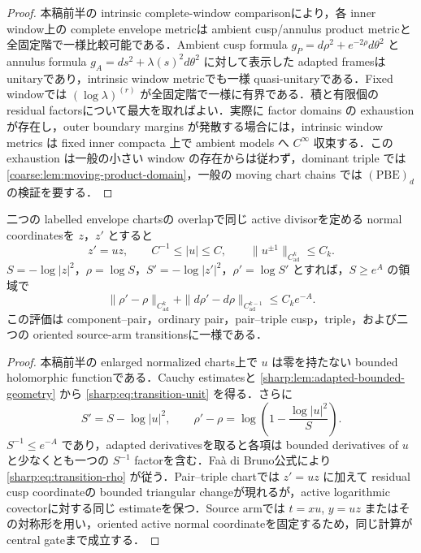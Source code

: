 \documentclass[a4paper,11pt]{ltjsarticle}
\numberwithin{equation}{section}
\theoremstyle{plain}
\theoremstyle{definition}
\theoremstyle{remark}
\begin{document}
\begin{proof}
本稿前半の intrinsic complete-window comparisonにより，各 inner window上の complete envelope metricは ambient cusp/annulus product metricと全固定階で一様比較可能である．Ambient cusp formula $g_P=d\rho^2+e^{-2\rho}d\theta^2$ と annulus formula
$g_A=ds^2+\lambda(s)^2d\theta^2$ に対して表示した adapted framesは unitaryであり，intrinsic window metricでも一様 quasi-unitaryである．Fixed windowでは $(\log\lambda)^{(r)}$ が全固定階で一様に有界である．積と有限個の residual factorsについて最大を取ればよい．実際に factor domains の exhaustion が存在し，outer boundary margins が発散する場合には，intrinsic window metrics は fixed inner compacta 上で ambient models へ $C^\infty$ 収束する．この exhaustion は一般の小さい window の存在からは従わず，dominant triple では \cref{coarse:lem:moving-product-domain}，一般の moving chart chains では $\mathrm{(PBE)}_d$ の検証を要する．
\end{proof}

\begin{proposition}\label{sharp:prop:transition-unit-estimates}
二つの labelled envelope chartsの overlapで同じ active divisorを定める normal coordinatesを $z$，$z'$ とすると
\begin{equation}\label{sharp:eq:transition-unit}
 z'=u z,
 \qquad C^{-1}\le|u|\le C,
 \qquad \|u^{\pm1}\|_{C^k_{\mathrm{ad}}}\le C_k.
\end{equation}
$S=-\log|z|^2$，$\rho=\log S$，$S'=-\log|z'|^2$，$\rho'=\log S'$ とすれば，$S\ge e^A$ の領域で
\begin{equation}\label{sharp:eq:transition-rho}
 \|\rho'-\rho\|_{C^k_{\mathrm{ad}}}
 +\|d\rho'-d\rho\|_{C^{k-1}_{\mathrm{ad}}}
 \le C_ke^{-A}.
\end{equation}
この評価は component--pair，ordinary pair，pair--triple cusp，triple，および二つの oriented source-arm transitionsに一様である．
\end{proposition}

\begin{proof}
本稿前半の enlarged normalized charts上で $u$ は零を持たない bounded holomorphic functionである．Cauchy estimatesと \cref{sharp:lem:adapted-bounded-geometry} から \eqref{sharp:eq:transition-unit} を得る．さらに
\[
 S'=S-\log|u|^2,
 \qquad
 \rho'-\rho=\log\left(1-\frac{\log|u|^2}{S}\right).
\]
$S^{-1}\le e^{-A}$ であり，adapted derivativesを取ると各項は bounded derivatives of $u$ と少なくとも一つの $S^{-1}$ factorを含む．Fa\`a di Bruno公式により \eqref{sharp:eq:transition-rho} が従う．Pair--triple chartでは $z'=u z$ に加えて residual cusp coordinateの bounded triangular changeが現れるが，active logarithmic covectorに対する同じ estimateを保つ．Source armでは $t=xu$, $y=uz$ またはその対称形を用い，oriented active normal coordinateを固定するため，同じ計算が central gateまで成立する．
\end{proof}
\end{document}
